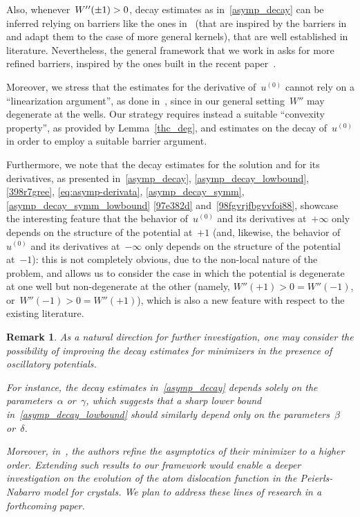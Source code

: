 \documentclass[10pt,a4paper]{amsart}
\newtheorem{rem}[theorem]{Remark}
\numberwithin{equation}{section}
\begin{document}
Also, whenever~$W\rq{}\rq{}(\pm1)>0$, decay estimates as in~\eqref{asymp_decay} can be inferred relying on barriers like the ones in~\cite[Lemma~4.1]{CP16} (that are inspired by the barriers in~\cite[Lemma~3.1]{SV14} and adapt them to the case of
more general kernels), that are well established in literature. Nevertheless, the general framework that
we work in asks for more refined barriers, inspired by the ones built in the recent paper~\cite{giovanni}.

Moreover, we stress that the estimates for the derivative of~$u^{(0)}$ cannot rely on a ``linearization argument'', as done in~\cite{CP16, PSV13},
since in our general setting~$W''$ may degenerate at the wells. Our strategy requires instead a suitable
``convexity property'', as provided by Lemma~\ref{thc_deg}, and estimates on the decay of~$u^{(0)}$ in order to employ
a suitable barrier argument.

Furthermore, we note that the decay estimates for the solution and for its derivatives,
as presented in~\eqref{asymp_decay}, \eqref{asymp_decay_lowbound}, \eqref{398r7gree},
\eqref{eq:asymp-derivata}, \eqref{asymp_decay_symm}, \eqref{asymp_decay_symm_lowbound}
\eqref{97e382d} and~\eqref{98fgvrjfbgvvfoi88},
showcase the interesting feature that the behavior of~$u^{(0)}$ and its derivatives at~$+\infty$ only depends on the structure of the potential at~$+1$ (and, likewise, the behavior of~$u^{(0)}$ and its derivatives at~$-\infty$ only depends on the structure of the potential at~$-1$):
this is not completely obvious, due to the non-local nature of the problem, and allows us to consider the case in which the potential
is degenerate at one well but non-degenerate at the other
(namely, $W''(+1)>0=W''(-1)$, or~$W''(-1)>0=W''(+1)$),
which is also a new feature with respect to the existing literature. 

\begin{rem}{\rm
As a natural direction for further investigation, one may consider the possibility of improving the decay estimates for minimizers in the presence of oscillatory potentials. 

For instance, the decay estimates in~\eqref{asymp_decay} depends solely on the parameters~$\alpha$ or~$\gamma$, which suggests that a sharp lower bound in~\eqref{asymp_decay_lowbound} should similarly depend only on the parameters~$\beta$ or~$\delta$.

Moreover, in~\cite[Proposition 6.4]{DPV15}, the authors refine the asymptotics of their minimizer to a higher order. Extending such results to our framework
would enable a deeper investigation on the evolution
of the atom dislocation function in the Peierls-Nabarro model
for crystals. We plan to address these lines of research in a forthcoming paper.}
\end{rem}
\end{document}
